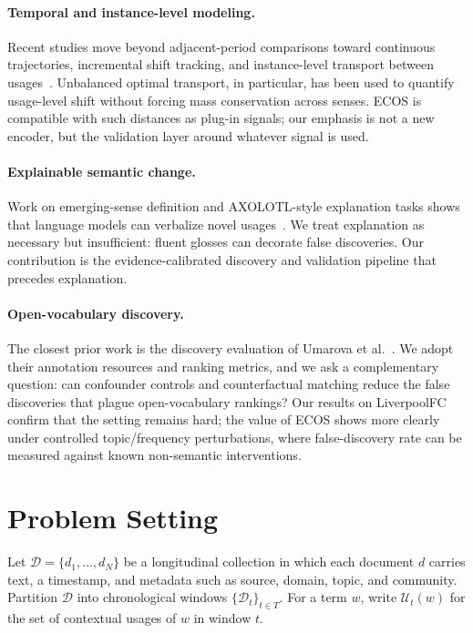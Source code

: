 \documentclass{llncs}
\begin{document}
\paragraph{Temporal and instance-level modeling.}
Recent studies move beyond adjacent-period comparisons toward continuous trajectories, incremental shift tracking, and instance-level transport between usages~\cite{martinc2020capturing,montariol2021scalable,periti2023studying}.
Unbalanced optimal transport, in particular, has been used to quantify usage-level shift without forcing mass conservation across senses.
ECOS is compatible with such distances as plug-in signals; our emphasis is not a new encoder, but the validation layer around whatever signal is used.

\paragraph{Explainable semantic change.}
Work on emerging-sense definition and AXOLOTL-style explanation tasks shows that language models can verbalize novel usages~\cite{axolotl2024}.
We treat explanation as necessary but insufficient: fluent glosses can decorate false discoveries.
Our contribution is the evidence-calibrated discovery and validation pipeline that precedes explanation.

\paragraph{Open-vocabulary discovery.}
The closest prior work is the discovery evaluation of Umarova et al.~\cite{umarova2025discovery}.
We adopt their annotation resources and ranking metrics, and we ask a complementary question: can confounder controls and counterfactual matching reduce the false discoveries that plague open-vocabulary rankings?
Our results on LiverpoolFC confirm that the setting remains hard; the value of ECOS shows more clearly under controlled topic/frequency perturbations, where false-discovery rate can be measured against known non-semantic interventions.

\section{Problem Setting}
\label{sec:problem}

Let $\mathcal{D}=\{d_1,\ldots,d_N\}$ be a longitudinal collection in which each document $d$ carries text, a timestamp, and metadata such as source, domain, topic, and community.
Partition $\mathcal{D}$ into chronological windows $\{ \mathcal{D}_t \}_{t\in T}$.
For a term $w$, write $\mathcal{U}_t(w)$ for the set of contextual usages of $w$ in window $t$.
\end{document}
